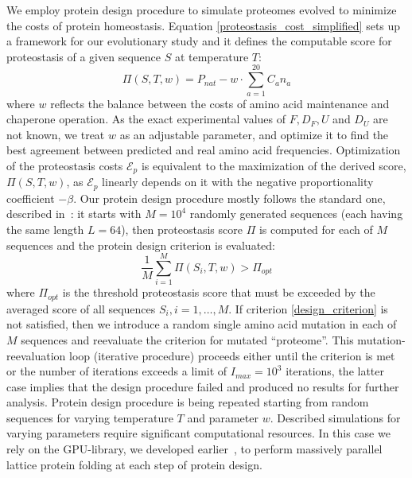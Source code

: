 \documentclass[10pt,letterpaper]{article}
\begin{document}
We employ protein design procedure to simulate proteomes evolved to minimize the costs of protein homeostasis. Equation \eqref{proteostasis_cost_simplified} sets up a framework for our evolutionary study and it defines the computable score for proteostasis of a given sequence $S$ at temperature $T$:
\begin{equation}
	\label{score_proteostasis}
	\Pi(S,T,\mathit{w}) = P_{nat} - \mathit{w}\cdot\sum\limits_{a=1}^{20}C_{a}n_{a}
\end{equation}
where $\mathit{w}$ reflects the balance between the costs of amino acid maintenance and chaperone operation. As the exact experimental values of $F,D_{F},U$ and $D_{U}$ are not known, we treat $\mathit{w}$ as an adjustable parameter, and optimize it to find the best agreement between predicted and real amino acid frequencies. Optimization of the proteostasis costs $\mathcal{E}_{p}$ is equivalent to the maximization of the derived score, $\Pi(S,T,\mathit{w})$, as $\mathcal{E}_{p}$ linearly depends on it with the negative proportionality coefficient $-\beta$. Our protein design procedure mostly follows the standard one, described in~\cite{Berezovsky2007Positive}: it starts with $M=10^{4}$ randomly generated sequences (each having the same length $L=64$), then proteostasis score $\Pi$ is computed for each of $M$ sequences and the protein design criterion is evaluated:
\begin{equation}
	\label{design_criterion}
	\frac{1}{M}\sum\limits_{i=1}^{M}\Pi(S_{i},T,\mathit{w}) > \Pi_{opt}
\end{equation}
where $\Pi_{opt}$ is the threshold proteostasis score that must be exceeded by the averaged score of all sequences $S_{i},i=1,\dots,M$. If criterion \eqref{design_criterion} is not satisfied, then we introduce a random single amino acid mutation in each of $M$ sequences and reevaluate the criterion for mutated ``proteome''. This mutation-reevaluation loop (iterative procedure) proceeds either until the criterion is met or the number of iterations exceeds a limit of $I_{max}=10^{3}$ iterations, the latter case implies that the design procedure failed and produced no results for further analysis. Protein design procedure is being repeated starting from random sequences for varying temperature $T$ and parameter $\mathit{w}$. Described simulations for varying parameters require significant computational resources. In this case we rely on the GPU-library, we developed earlier~\cite{Venev2015Massively}, to perform massively parallel lattice protein folding at each step of protein design.
\end{document}
